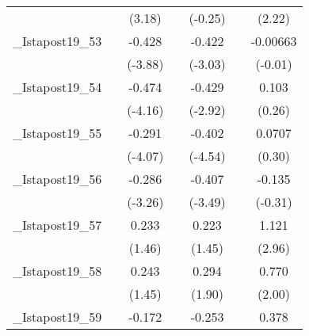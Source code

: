 {\begin{tabular}{l*{6}{c}}
            &                     &      (3.18)         &                     &     (-0.25)         &                     &      (2.22)         \\
[1em]
\_Istapost19\_53&                     &      -0.428\sym{***}&                     &      -0.422\sym{**} &                     &    -0.00663         \\
            &                     &     (-3.88)         &                     &     (-3.03)         &                     &     (-0.01)         \\
[1em]
\_Istapost19\_54&                     &      -0.474\sym{***}&                     &      -0.429\sym{**} &                     &       0.103         \\
            &                     &     (-4.16)         &                     &     (-2.92)         &                     &      (0.26)         \\
[1em]
\_Istapost19\_55&                     &      -0.291\sym{***}&                     &      -0.402\sym{***}&                     &      0.0707         \\
            &                     &     (-4.07)         &                     &     (-4.54)         &                     &      (0.30)         \\
[1em]
\_Istapost19\_56&                     &      -0.286\sym{**} &                     &      -0.407\sym{**} &                     &      -0.135         \\
            &                     &     (-3.26)         &                     &     (-3.49)         &                     &     (-0.31)         \\
[1em]
\_Istapost19\_57&                     &       0.233         &                     &       0.223         &                     &       1.121\sym{**} \\
            &                     &      (1.46)         &                     &      (1.45)         &                     &      (2.96)         \\
[1em]
\_Istapost19\_58&                     &       0.243         &                     &       0.294         &                     &       0.770         \\
            &                     &      (1.45)         &                     &      (1.90)         &                     &      (2.00)         \\
[1em]
\_Istapost19\_59&                     &      -0.172\sym{**} &                     &      -0.253\sym{**} &                     &       0.378         \\

\end{tabular}}

